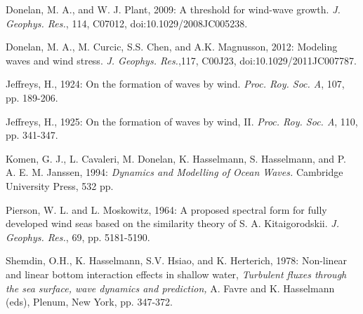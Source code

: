 \documentclass[letterpaper]{article}
\numberwithin{equation}{section}
\begin{document}
Donelan, M. A., and W. J. Plant, 2009: A threshold for wind-wave growth. \textit{J. Geophys. Res.}, 114, C07012, doi:10.1029/2008JC005238.

Donelan, M. A., M. Curcic, S.S. Chen, and A.K. Magnusson, 2012: Modeling waves and wind stress. \textit{J. Geophys. Res.},117, C00J23, doi:10.1029/2011JC007787.

Jeffreys, H., 1924: On the formation of waves by wind. \textit{Proc. Roy. Soc. A}, 107, pp. 189-206.

Jeffreys, H., 1925: On the formation of waves by wind, II. \textit{Proc. Roy. Soc. A}, 110, pp. 341-347.

Komen, G. J., L. Cavaleri, M. Donelan, K. Hasselmann, S. Hasselmann, and P. A. E. M. Janssen, 1994: \textit{Dynamics and Modelling of Ocean Waves.} Cambridge University Press, 532 pp.

Pierson, W. L. and L. Moskowitz, 1964: A proposed spectral form for fully developed wind seas based on the similarity theory of S. A. Kitaigorodskii. \textit{J. Geophys. Res.}, 69, pp. 5181-5190.

Shemdin, O.H., K. Hasselmann, S.V. Hsiao, and K. Herterich, 1978: Non-linear and linear bottom interaction effects in shallow water, \textit{Turbulent fluxes through the sea surface, wave dynamics and prediction,} A. Favre and K. Hasselmann (eds), Plenum, New York, pp. 347-372. 
\end{document}

